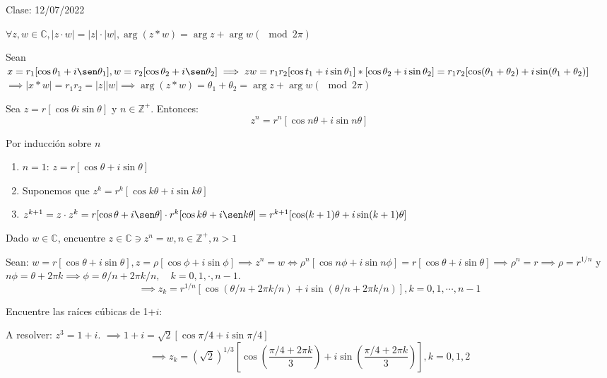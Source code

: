 Clase: 12/07/2022

\begin{prop}
    $\forall z,w\in\mathbb{C},|z\cdot w|=|z|\cdot|w|, \arg(z*w)=\arg z+\arg w   (\mod 2\pi) $
    \begin{dem}
        Sean $x=r_1[\cos\theta_1 + i\sen\theta_1], w=r_2[\cos \theta_2+i\sen \theta_2]\implies zw = r_1r_2[\cos t_1+i\sin\theta_1]*[\cos \theta_2 +i\sin\theta_2]= r_1r_2[\cos(\theta_1+\theta_2)+i\sin(\theta_1+\theta_2)]$
        $\implies |x*w|=r_1r_2=|z||w|\implies \arg(z*w)=\theta_1+\theta_2=\arg z+\arg w   (\mod 2\pi)$
    \end{dem}
\end{prop}

\begin{prop}[De Moivre]
    Sea $z=r[\cos\theta i\sin \theta]$ y $n\in\mathbb{Z}^+$. Entonces:
    $$z^n=r^n\left[\cos n\theta +i\sin n\theta \right]$$
    \begin{dem}
        Por inducción sobre $n$
        \begin{enumerate}
            \item $n=1$: $z=r\left[\cos \theta + i \sin \theta \right]$
            \item Suponemos que $z^k = r^k[\cos k \theta+i\sin k\theta]$
            \item $z^{k+1}=z\cdot z^k = r[\cos \theta +i\sen \theta]\cdot r^k[\cos k\theta +i\sen k\theta] = r^{k+1}[\cos(k+1)\theta +i\sin(k+1)\theta]$ 
        \end{enumerate}
    \end{dem}

\end{prop}

\begin{problema}
    Dado $w\in\mathbb{C}$, encuentre $z\in\mathbb{C}\ni z^n=w, n\in\mathbb{Z}^+,n>1$
    \begin{sol}
        Sean: $w=r[\cos\theta +i\sin \theta],z=\rho[\cos\phi +i\sin \phi]\implies z^n =w\iff \rho^n[\cos n\phi +i\sin n\phi]=r[\cos\theta+i\sin\theta]\implies \rho^n =r\implies \rho =r^{1/n}$ y $n\phi =\theta+2\pi k\implies \phi =\theta/n +2\pi k/n, \quad k=0,1,\cdot,n-1$. $$\implies z_k= r^{1/n}\left[\cos\left(\theta/n + 2\pi k/n\right)+i\sin \left(\theta/n +2\pi k/n\right)\right], k=0,1,\cdots, n-1$$
    \end{sol}
\end{problema}

\begin{ejemplo}
    Encuentre las raíces cúbicas de 1+$i$: 
    \begin{sol}
        A resolver: $z^3=1+i$. $\implies 1+i = \sqrt{2}\left[\cos\pi/4 +i \sin \pi/4\right]$
        $$\implies z_k= (\sqrt{2})^{1/3}\left[\cos\left(\frac{\pi/4 +2\pi k}{3}\right)+i\sin \left(\frac{\pi/4 +2\pi k}{3}\right)\right], k=0,1,2$$
    \end{sol}
\end{ejemplo}


